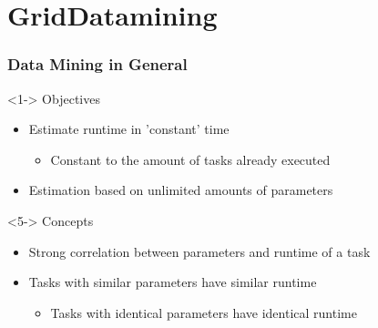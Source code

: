\section{GridDatamining}

\begin{frame}
	\frametitle{Data Mining in General}
	
		\begin{block}<1-> {Objectives}
			\begin{itemize}
				\item<2-> {Estimate runtime in 'constant' time}
						\begin{itemize}
							\item<3-> {Constant to the amount of tasks already 											executed}	
						\end{itemize}
				\item<4-> {Estimation based on unlimited amounts of parameters}
			\end{itemize}
		\end{block}
		
		\begin{block}<5-> {Concepts}
				\begin{itemize}
					\item<6-> {Strong correlation between parameters and 										runtime of a task}
					\item<7-> {Tasks with similar parameters have similar 										runtime}
						\begin{itemize}
							\item<8-> {Tasks with identical parameters have 											identical runtime}	
						\end{itemize}	
				\end{itemize}
		\end{block}
\end{frame}


